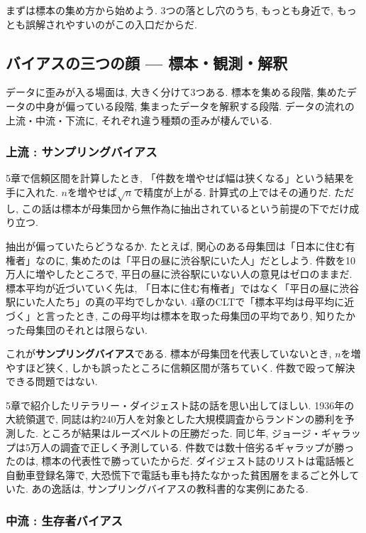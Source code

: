 まずは標本の集め方から始めよう.
3つの落とし穴のうち, もっとも身近で, もっとも誤解されやすいのがこの入口だからだ.


\subsection{バイアスの三つの顔 — 標本・観測・解釈}

データに歪みが入る場面は, 大きく分けて3つある.
標本を集める段階, 集めたデータの中身が偏っている段階, 集まったデータを解釈する段階.
データの流れの上流・中流・下流に, それぞれ違う種類の歪みが棲んでいる.

\subsubsection*{上流 : サンプリングバイアス}

5章で信頼区間を計算したとき, 「件数を増やせば幅は狭くなる」という結果を手に入れた.
$n$を増やせば$\sqrt{n}$で精度が上がる. 計算式の上ではその通りだ.
ただし, この話は標本が母集団から無作為に抽出されているという前提の下でだけ成り立つ.

抽出が偏っていたらどうなるか.
たとえば, 関心のある母集団は「日本に住む有権者」なのに, 集めたのは「平日の昼に渋谷駅にいた人」だとしよう.
件数を10万人に増やしたところで, 平日の昼に渋谷駅にいない人の意見はゼロのままだ.
標本平均が近づいていく先は, 「日本に住む有権者」ではなく「平日の昼に渋谷駅にいた人たち」の真の平均でしかない.
4章のCLTで「標本平均は母平均に近づく」と言ったとき, この母平均は標本を取った母集団の平均であり, 知りたかった母集団のそれとは限らない.

これが\textbf{サンプリングバイアス}である.
標本が母集団を代表していないとき, $n$を増やすほど狭く, しかも誤ったところに信頼区間が落ちていく.
件数で殴って解決できる問題ではない.

5章で紹介したリテラリー・ダイジェスト誌の話を思い出してほしい.
1936年の大統領選で, 同誌は約240万人を対象とした大規模調査からランドンの勝利を予測した.
ところが結果はルーズベルトの圧勝だった. 同じ年, ジョージ・ギャラップは5万人の調査で正しく予測している.
件数では数十倍劣るギャラップが勝ったのは, 標本の代表性で勝っていたからだ.
ダイジェスト誌のリストは電話帳と自動車登録名簿で, 大恐慌下で電話も車も持たなかった貧困層をまるごと外していた.
あの逸話は, サンプリングバイアスの教科書的な実例にあたる.

\subsubsection*{中流 : 生存者バイアス}

